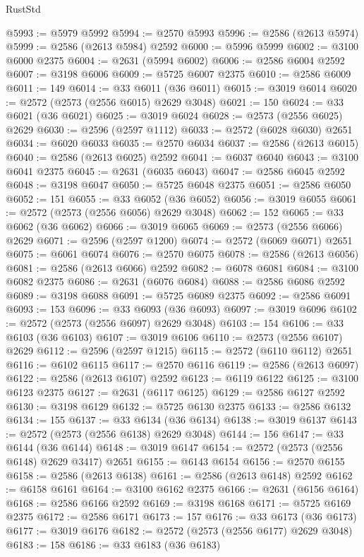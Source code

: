 \begin{lexlean}{RustStd}
\begin{coremodule}
@5993 := @5979 @5992
@5994 := @2570 @5993
@5996 := @2586 (@2613 @5974)
@5999 := @2586 (@2613 @5984) @2592
@6000 := @5996 @5999
@6002 := @3100 @6000 @2375
@6004 := @2631 (@5994 @6002)
@6006 := @2586 @6004 @2592
@6007 := @3198 @6006
@6009 := @5725 @6007 @2375
@6010 := @2586 @6009
@6011 := 149
@6014 := @33 @6011 (@36 @6011)
@6015 := @3019 @6014
@6020 := @2572 (@2573 (@2556 @6015) @2629 @3048)
@6021 := 150
@6024 := @33 @6021 (@36 @6021)
@6025 := @3019 @6024
@6028 := @2573 (@2556 @6025) @2629
@6030 := @2596 (@2597 @1112)
@6033 := @2572 (@6028 @6030) @2651
@6034 := @6020 @6033
@6035 := @2570 @6034
@6037 := @2586 (@2613 @6015)
@6040 := @2586 (@2613 @6025) @2592
@6041 := @6037 @6040
@6043 := @3100 @6041 @2375
@6045 := @2631 (@6035 @6043)
@6047 := @2586 @6045 @2592
@6048 := @3198 @6047
@6050 := @5725 @6048 @2375
@6051 := @2586 @6050
@6052 := 151
@6055 := @33 @6052 (@36 @6052)
@6056 := @3019 @6055
@6061 := @2572 (@2573 (@2556 @6056) @2629 @3048)
@6062 := 152
@6065 := @33 @6062 (@36 @6062)
@6066 := @3019 @6065
@6069 := @2573 (@2556 @6066) @2629
@6071 := @2596 (@2597 @1200)
@6074 := @2572 (@6069 @6071) @2651
@6075 := @6061 @6074
@6076 := @2570 @6075
@6078 := @2586 (@2613 @6056)
@6081 := @2586 (@2613 @6066) @2592
@6082 := @6078 @6081
@6084 := @3100 @6082 @2375
@6086 := @2631 (@6076 @6084)
@6088 := @2586 @6086 @2592
@6089 := @3198 @6088
@6091 := @5725 @6089 @2375
@6092 := @2586 @6091
@6093 := 153
@6096 := @33 @6093 (@36 @6093)
@6097 := @3019 @6096
@6102 := @2572 (@2573 (@2556 @6097) @2629 @3048)
@6103 := 154
@6106 := @33 @6103 (@36 @6103)
@6107 := @3019 @6106
@6110 := @2573 (@2556 @6107) @2629
@6112 := @2596 (@2597 @1215)
@6115 := @2572 (@6110 @6112) @2651
@6116 := @6102 @6115
@6117 := @2570 @6116
@6119 := @2586 (@2613 @6097)
@6122 := @2586 (@2613 @6107) @2592
@6123 := @6119 @6122
@6125 := @3100 @6123 @2375
@6127 := @2631 (@6117 @6125)
@6129 := @2586 @6127 @2592
@6130 := @3198 @6129
@6132 := @5725 @6130 @2375
@6133 := @2586 @6132
@6134 := 155
@6137 := @33 @6134 (@36 @6134)
@6138 := @3019 @6137
@6143 := @2572 (@2573 (@2556 @6138) @2629 @3048)
@6144 := 156
@6147 := @33 @6144 (@36 @6144)
@6148 := @3019 @6147
@6154 := @2572 (@2573 (@2556 @6148) @2629 @3417) @2651
@6155 := @6143 @6154
@6156 := @2570 @6155
@6158 := @2586 (@2613 @6138)
@6161 := @2586 (@2613 @6148) @2592
@6162 := @6158 @6161
@6164 := @3100 @6162 @2375
@6166 := @2631 (@6156 @6164)
@6168 := @2586 @6166 @2592
@6169 := @3198 @6168
@6171 := @5725 @6169 @2375
@6172 := @2586 @6171
@6173 := 157
@6176 := @33 @6173 (@36 @6173)
@6177 := @3019 @6176
@6182 := @2572 (@2573 (@2556 @6177) @2629 @3048)
@6183 := 158
@6186 := @33 @6183 (@36 @6183)

\end{coremodule}
\end{lexlean}
